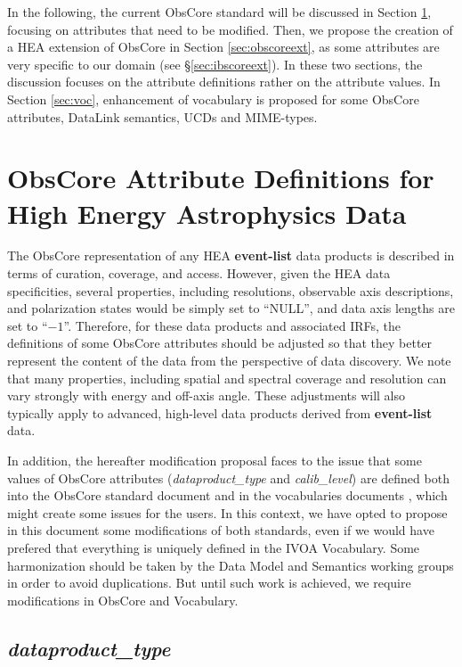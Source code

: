 \documentclass[11pt,a4paper]{ivoa}
\begin{document}
In the following, the current ObsCore standard will be discussed in Section \ref{sec:obscore}, focusing on attributes that need to be modified. Then, we propose the creation of a \gls{HEA} extension of ObsCore in Section \ref{sec:obscoreext}, as some attributes are very specific to our domain (see \S\ref{sec:ibscoreext}). In these two sections, the discussion focuses on the attribute definitions rather on the attribute values. In Section \ref{sec:voc}, enhancement of vocabulary is proposed for some ObsCore attributes, DataLink semantics, UCDs and MIME-types.

\section{ObsCore Attribute Definitions for High Energy Astrophysics Data}
\label{sec:obscore}

The ObsCore representation of any \gls{HEA} \textbf{event-list} data products is described in terms of curation, coverage, and access. However, given the \gls{HEA} data specificities, several properties, including resolutions, observable axis descriptions, and polarization states would be simply set to ``NULL'', and data axis lengths are set to ``$-1$''.  Therefore, for these data products and associated \glspl{IRF}, the definitions of some ObsCore attributes should be adjusted so that they better represent the content of the data from the perspective of data discovery. We note that many properties, including spatial and spectral coverage and resolution can vary strongly with energy and off-axis angle. These adjustments will also typically apply to advanced, high-level data products derived from \textbf{event-list} data.

In addition, the hereafter modification proposal faces to the issue that some values of ObsCore attributes ({\em dataproduct\_type} and {\em calib\_level}) are defined both into the ObsCore standard document \citep{2017ivoa.spec.0509L} and in the vocabularies documents \citep{2023ivoa.spec.0206D, 2021ivoa.spec.0525D}, which might create some issues for the users. In this context, we have opted to propose  in this document some modifications of both standards, even if we would have prefered that everything is uniquely defined in the \gls{IVOA} Vocabulary. Some harmonization should be taken by the Data Model and Semantics working groups in order to avoid duplications. But until such work is achieved, we require modifications in ObsCore and Vocabulary.

\subsection{{\em dataproduct\_type}}
\label{sec:dataproduct_type}
\end{document}
